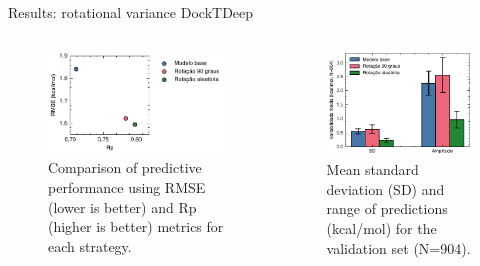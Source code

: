 \documentclass[aspectratio=169,xcolor=dvipsnames]{beamer}
\begin{document}
\begin{frame}{Results: rotational variance \hfill {\footnotesize \alert{DockTDeep}}}
    \begin{columns}[c]

        \begin{figure}
            \centering
            \includegraphics[width=1\linewidth]{imgs/results/rotation-performance.pdf}
            \caption{Comparison of predictive performance using RMSE (lower is better) and Rp (higher is better) metrics for each strategy.}
        \end{figure}


        \begin{figure}
            \centering
            \includegraphics[width=1\linewidth]{imgs/results/mean-variances.pdf}
            \caption{Mean standard deviation (SD) and range of predictions (kcal/mol) for the validation set (N=904).}
        \end{figure}


    \end{columns}
\end{frame}
\end{document}
